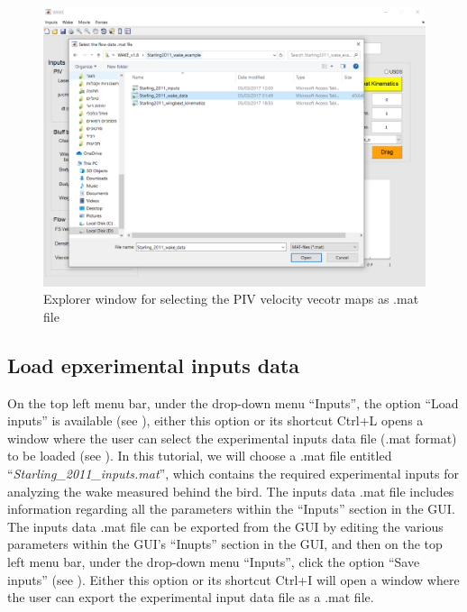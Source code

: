 \documentclass[12pt,a4paper]{article}
\begin{document}
\begin{figure}[ht!]
	\centering
	\includegraphics[width=\textwidth]{explorer-window-wake-data}
	\caption{Explorer window for selecting the PIV velocity vecotr maps as .mat file}
	\label{fig:GUI-select_mat_file}
\end{figure}


\subsection{Load epxerimental inputs data}
On the top left menu bar, under the drop-down menu ``Inputs'', the option ``Load inputs'' is available (see ), either this option or its shortcut Ctrl+L opens a window where the user can select the experimental inputs data file (.mat format) to be loaded (see ).
In this tutorial, we will choose a .mat file entitled ``\textit{Starling\_2011\_inputs.mat}'', which contains the required experimental inputs for analyzing the wake measured behind the bird.
The inputs data .mat file includes information regarding all the parameters within the ``Inputs'' section in the GUI.  The inputs data .mat file can be exported from the GUI by editing the various parameters within the GUI's ``Inupts'' section in the GUI, and then on the top left menu bar, under the drop-down menu ``Inputs'', click the option ``Save inputs'' (see ). 
Either this option or its shortcut Ctrl+I will open a window where the user can export the experimental input data file as a .mat file.
\end{document}
